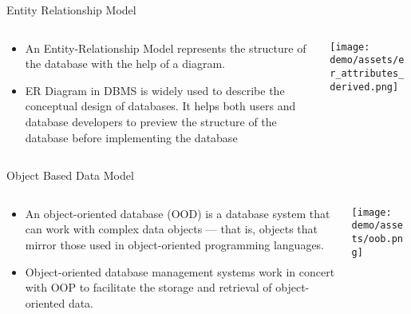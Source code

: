 \documentclass[12pt, aspectratio=169]{beamer}
\begin{document}
\begin{frame}{Entity Relationship Model}
    \begin{columns}[onlytextwidth, T]
    \begin{column}{0.47\linewidth}
    \begin{itemize}
        \item An Entity-Relationship Model represents the structure of the database with the help of a diagram. 
        \item ER Diagram in DBMS is widely used to describe the conceptual design of databases. It helps both users and database developers to preview the structure of the database before implementing the database
    \end{itemize}
    \end{column}
    \begin{column}{0.47\linewidth}
        \begin{center}     \texttt{[image: demo/assets/er\_attributes\_derived.png]}
        \end{center}
    \end{column}
    \end{columns}
\end{frame}

\begin{frame}{Object Based Data Model}
\begin{columns}[onlytextwidth, T]
    \begin{column}{0.47\linewidth}
        \begin{itemize}
            \item An object-oriented database (OOD) is a database system that can work with complex data objects — that is, objects that mirror those used in object-oriented programming languages.
            \item Object-oriented database management systems work in concert with OOP to facilitate the storage and retrieval of object-oriented data.
        \end{itemize}
    \end{column}
    \begin{column}{0.47\linewidth}
    \texttt{[image: demo/assets/oob.png]}
    \end{column}
\end{columns}
\end{frame}

\end{document}
